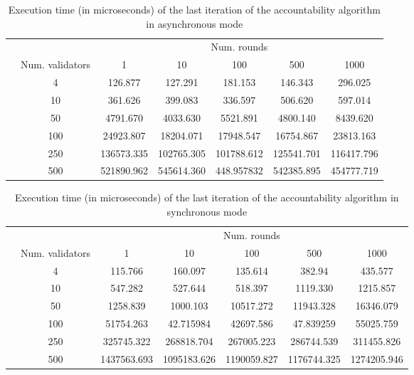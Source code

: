 \documentclass[a4paper,11pt,oneside]{report}
\begin{document}
\begin{table}[]
\centering
\begin{tabular}{l|c|c|c|c|c|c|}
\cline{2-7}
                  &  & \multicolumn{5}{c|}{Num. rounds} \\ \cline{2-7} 
\multirow{7}{*}{} & Num. validators & 1   & 10   & 100  & 500  & 1000  \\ \cline{2-7} 
                  & 4               & 126.877 & 127.291  & 181.153 & 146.343 & 296.025       \\ \cline{2-7} 
                  & 10              & 361.626   & 399.083   & 336.597  & 506.620  &  597.014     \\ \cline{2-7} 
                  & 50              & 4791.670    & 4033.630     & 5521.891      &  4800.140    & 8439.620      \\ \cline{2-7} 
                  & 100             & 24923.807    & 18204.071     & 17948.547     & 16754.867     &   23813.163    \\ \cline{2-7} 
                  & 250             & 136573.335    &  102765.305    & 101788.612     & 125541.701      & 116417.796      \\ \cline{2-7} 
                  & 500             &  521890.962   &  545614.360    & 448.957832     &  542385.895    &  454777.719     \\ \cline{2-7} 
\end{tabular}
\caption{Execution time (in microseconds) of the last iteration of the accountability algorithm in asynchronous mode}
\end{table}


\begin{table}[]
\centering
\begin{tabular}{l|c|c|c|c|c|c|}
\cline{2-7}
                  &   & \multicolumn{5}{c|}{Num. rounds} \\ \cline{2-7} 
\multirow{7}{*}{} & Num. validators & 1   & 10   & 100  & 500  & 1000  \\ \cline{2-7} 
                  & 4               & 115.766  & 160.097  & 135.614 &  382.94 & 435.577      \\ \cline{2-7} 
                  & 10              & 547.282    & 527.644     &   518.397   & 1119.330  & 1215.857      \\ \cline{2-7} 
                  & 50              & 1258.839    &  1000.103    & 10517.272     &  11943.328    &  16346.079     \\ \cline{2-7} 
                  & 100             & 51754.263  & 42.715984    & 42697.586  & 47.839259     & 55025.759      \\ \cline{2-7} 
                  & 250             &  325745.322   & 268818.704     &  267005.223    &  286744.539    &  311455.826     \\ \cline{2-7} 
                  & 500             & 1437563.693    & 1095183.626     &  1190059.827    &  1176744.325    & 1274205.946      \\ \cline{2-7} 
\end{tabular}
\caption{Execution time (in microseconds) of the last iteration of the accountability algorithm in synchronous mode}
\end{table}
\end{document}
